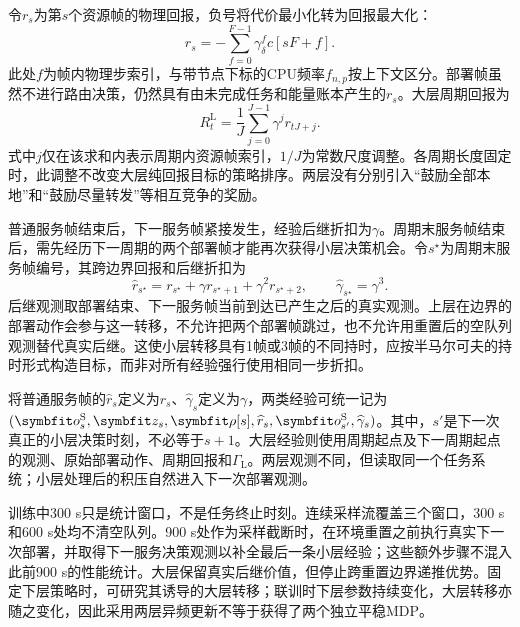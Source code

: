 令$r_s$为第$s$个资源帧的物理回报，负号将代价最小化转为回报最大化：
\begin{equation}
 r_s=-\sum_{f=0}^{F-1}\gamma_\delta^f c[sF+f].
 \label{eq:framereward}
\end{equation}
此处$f$为帧内物理步索引，与带节点下标的CPU频率$f_{n,p}$按上下文区分。部署帧虽然不进行路由决策，仍然具有由未完成任务和能量账本产生的$r_s$。大层周期回报为
\begin{equation}
 R_t^{\mathrm L}=\frac{1}{J}\sum_{j=0}^{J-1}\gamma^j r_{tJ+j}.
 \label{eq:macroreward}
\end{equation}
式中$j$仅在该求和内表示周期内资源帧索引，$1/J$为常数尺度调整。各周期长度固定时，此调整不改变大层纯回报目标的策略排序。两层没有分别引入“鼓励全部本地”和“鼓励尽量转发”等相互竞争的奖励。

普通服务帧结束后，下一服务帧紧接发生，经验后继折扣为$\gamma$。周期末服务帧结束后，需先经历下一周期的两个部署帧才能再次获得小层决策机会。令$s^\star$为周期末服务帧编号，其跨边界回报和后继折扣为
\begin{equation}
 \widehat r_{s^\star}
 =r_{s^\star}+\gamma r_{s^\star+1}
 +\gamma^2r_{s^\star+2},
 \qquad
 \widehat\gamma_{s^\star}=\gamma^3.
 \label{eq:boundary}
\end{equation}
后继观测取部署结束、下一服务帧当前到达已产生之后的真实观测。上层在边界的部署动作会参与这一转移，不允许把两个部署帧跳过，也不允许用重置后的空队列观测替代真实后继。这使小层转移具有1帧或3帧的不同持时，应按半马尔可夫的持时形式构造目标，而非对所有经验强行使用相同一步折扣。

将普通服务帧的$\widehat r_s$定义为$r_s$、$\widehat\gamma_s$定义为$\gamma$，两类经验可统一记为$(\vct o_s^{\mathrm S},\vct z_s,\vct\rho[s],\widehat r_s,\vct o_{s'}^{\mathrm S},\widehat\gamma_s)$。其中，$s'$是下一次真正的小层决策时刻，不必等于$s+1$。大层经验则使用周期起点及下一周期起点的观测、原始部署动作、周期回报和$\Gamma_{\mathrm L}$。两层观测不同，但读取同一个任务系统；小层处理后的积压自然进入下一次部署观测。

训练中300 s只是统计窗口，不是任务终止时刻。连续采样流覆盖三个窗口，300 s和600 s处均不清空队列。900 s处作为采样截断时，在环境重置之前执行真实下一次部署，并取得下一服务决策观测以补全最后一条小层经验；这些额外步骤不混入此前900 s的性能统计。大层保留真实后继价值，但停止跨重置边界递推优势。固定下层策略时，可研究其诱导的大层转移；联训时下层参数持续变化，大层转移亦随之变化，因此采用两层异频更新不等于获得了两个独立平稳MDP。
